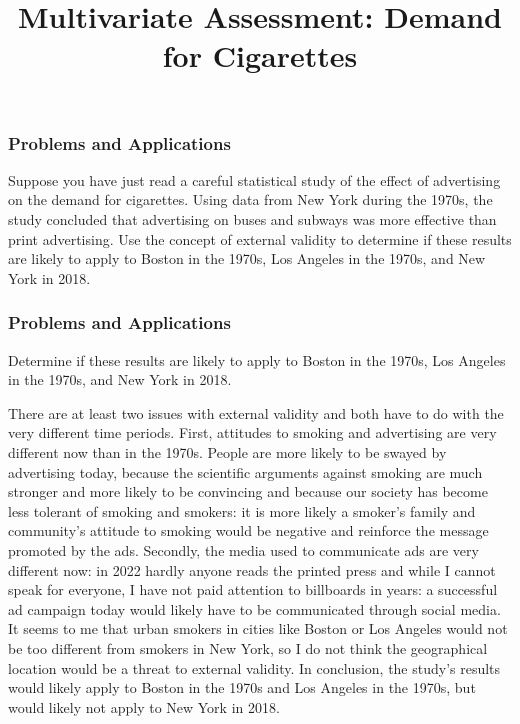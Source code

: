 \title[Multivariate Assessment]{Multivariate Assessment: Demand for Cigarettes}
\date{}







\begin{frame}
\frametitle{Problems and Applications}
Suppose you have just read a careful statistical study of the effect of advertising on the demand for cigarettes. Using data from New York during the 1970s, the study concluded that advertising on buses and subways was more effective than print advertising. Use the concept of external validity to determine if these results are likely to apply to Boston in the 1970s, Los Angeles in the 1970s, and New York in 2018.
\end{frame}


\begin{frame}
\frametitle{Problems and Applications}
Determine if these results are likely to apply to Boston in the 1970s, Los Angeles in the 1970s, and New York in 2018.
\begin{answer}
There are at least two issues with external validity and both have to do with the very different time periods. First, attitudes to smoking and advertising are very different now than in the 1970s. People are more likely to be swayed by advertising today, because the scientific arguments against smoking are much stronger and more likely to be convincing and because our society has become less tolerant of smoking and smokers: it is more likely a smoker's family and community's attitude to smoking would be negative and reinforce the message promoted by the ads. Secondly, the media used to communicate ads are very different now: in 2022 hardly anyone reads the printed press and while I cannot speak for everyone, I have not paid attention to billboards in years: a successful ad campaign today would likely have to be communicated through social media. It seems to me that urban smokers in cities like Boston or Los Angeles would not be too different from smokers in New York, so I do not think the geographical location would be a threat to external validity. In conclusion, the study's results would likely apply to Boston in the 1970s and Los Angeles in the 1970s, but would likely not apply to New York in 2018.
\end{answer}
\end{frame}



